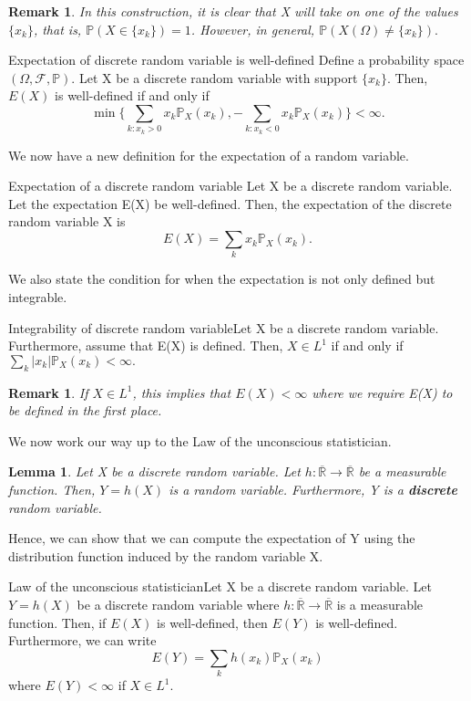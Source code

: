 \documentclass[twoside]{article}
\newtheorem{lemma}[theorem]{Lemma}
\newtheorem{remark}[theorem]{Remark}
\newcommand{\sigmalgebra}{\mathcal{F}}
\newcommand{\prob}{\mathbb{P}}
\begin{document}
\begin{remark}In this construction, it is clear that X will take on one of the values $\{x_k\}$, that is, $\prob(X \in \{x_k\}) = 1$. However, in general, $\prob(X(\Omega) \neq \{x_k\}).$
\end{remark}

\begin{proposition_exam}{Expectation of discrete random variable is well-defined}{} Define a probability space $(\Omega, \sigmalgebra, \prob).$ Let X be a discrete random variable with support $\{x_k\}.$ Then, $E(X)$ is well-defined if and only if 
$$
\min\bigg\{\sum_{k: x_k > 0}x_k\prob_{X}(x_k), -\sum_{k: x_k < 0}x_k\prob_{X}(x_k) \bigg\} < \infty.
$$
\end{proposition_exam}

We now have a new definition for the expectation of a random variable.
\begin{definition_exam}{Expectation of a discrete random variable}{} Let X be a discrete random variable. Let the expectation E(X) be well-defined. Then, the expectation of the discrete random variable X is 
$$
E(X) = \sum_kx_k\prob_X(x_k).
$$
\end{definition_exam}


We also state the condition for when the expectation is not only defined but integrable.
\begin{proposition_exam}{Integrability of discrete random variable}{}Let X be a discrete random variable. Furthermore, assume that E(X) is defined. Then, $X \in L^1$ if and only if $\sum_k|x_k|\prob_X(x_k) < \infty.$
\end{proposition_exam}

\begin{remark}If $X \in L^1$, this implies that $E(X) < \infty$ where we require E(X) to be defined in the first place.
\end{remark}

We now work our way up to the Law of the unconscious statistician.
\begin{lemma}Let X be a discrete random variable. Let $h: \overline{\mathbb{R}} \rightarrow \overline{\mathbb{R}}$ be a measurable function. Then, $Y = h(X)$ is a random variable. Furthermore, Y is a \textbf{discrete} random variable.
\end{lemma}

Hence, we can show that we can compute the expectation of Y using the distribution function induced by the random variable X.
\begin{theorem_exam}{Law of the unconscious statistician}{}Let X be a discrete random variable. Let $Y = h(X)$ be a discrete random variable where $h: \overline{\mathbb{R}} \rightarrow \overline{\mathbb{R}}$ is a measurable function. Then, if $E(X)$ is well-defined, then $E(Y)$ is well-defined. Furthermore, we can write 
$$
E(Y) = \sum_kh(x_k)\prob_X(x_k)
$$
where $E(Y) < \infty$ if $X \in L^1.$
\end{theorem_exam}
\end{document}
